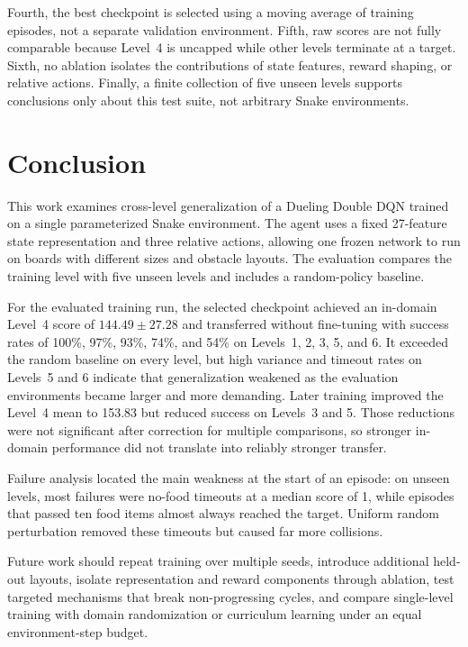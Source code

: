 \documentclass[journal]{IEEEtran}
\begin{document}
Fourth, the best checkpoint is selected using a moving average of training
episodes, not a separate validation environment. Fifth, raw scores are not
fully comparable because Level~4 is uncapped while other levels terminate at a
target. Sixth, no ablation isolates the contributions of state features, reward
shaping, or relative actions. Finally, a finite collection of five unseen
levels supports conclusions only about this test suite, not arbitrary Snake
environments.

\section{Conclusion}
\label{sec:conclusion}

This work examines cross-level generalization of a Dueling Double DQN trained
on a single parameterized Snake environment. The agent uses a fixed 27-feature
state representation and three relative actions, allowing one frozen network to
run on boards with different sizes and obstacle layouts. The evaluation compares
the training level with five unseen levels and includes a random-policy baseline.

For the evaluated training run, the selected checkpoint achieved an in-domain
Level~4 score of
$144.49\pm27.28$ and transferred without fine-tuning with success rates of
100\%, 97\%, 93\%, 74\%, and 54\% on Levels~1, 2, 3, 5, and 6. It exceeded the
random baseline on every level, but high variance and timeout rates on Levels~5
and 6 indicate that generalization weakened as the evaluation environments
became larger and more demanding. Later training improved the Level~4 mean to
153.83 but reduced success on Levels~3 and 5. Those reductions were not
significant after correction for multiple comparisons, so stronger in-domain
performance did not translate into reliably stronger transfer.

Failure analysis located the main weakness at the start of an episode: on
unseen levels, most failures were no-food timeouts at a median score of 1,
while episodes that passed ten food items almost always reached the target.
Uniform random perturbation removed these timeouts but caused far more
collisions.

Future work should repeat training over multiple seeds, introduce additional
held-out layouts, isolate representation and reward components through ablation,
test targeted mechanisms that break non-progressing cycles, and compare
single-level training with domain randomization or curriculum learning under an
equal environment-step budget.



\end{document}
